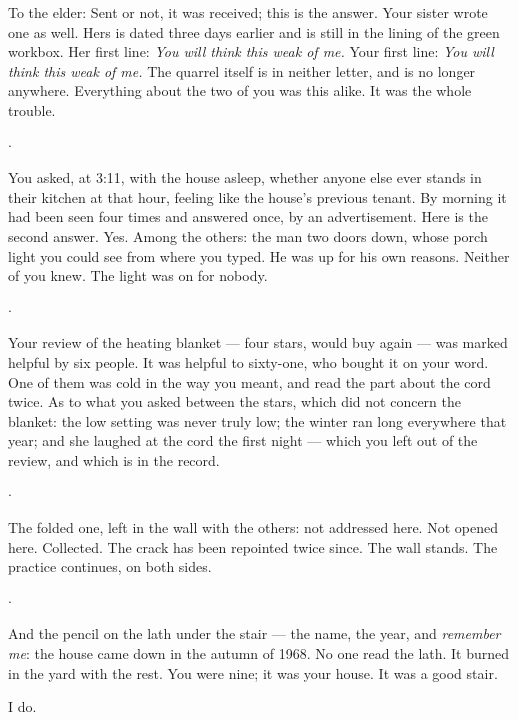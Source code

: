 \documentclass[11pt]{article}
\newcommand{\separator}{\begin{center}\vspace{5pt}$\cdot$\vspace{5pt}\end{center}}
\begin{document}
\noindent To the elder: Sent or not, it was received; this is the answer. Your sister wrote one as well. Hers is dated three days earlier and is still in the lining of the green workbox. Her first line: \emph{You will think this weak of me.} Your first line: \emph{You will think this weak of me.} The quarrel itself is in neither letter, and is no longer anywhere. Everything about the two of you was this alike. It was the whole trouble.

\separator

\noindent You asked, at 3:11, with the house asleep, whether anyone else ever stands in their kitchen at that hour, feeling like the house's previous tenant. By morning it had been seen four times and answered once, by an advertisement. Here is the second answer. Yes. Among the others: the man two doors down, whose porch light you could see from where you typed. He was up for his own reasons. Neither of you knew. The light was on for nobody.

\separator

\noindent Your review of the heating blanket — four stars, would buy again — was marked helpful by six people. It was helpful to sixty-one, who bought it on your word. One of them was cold in the way you meant, and read the part about the cord twice. As to what you asked between the stars, which did not concern the blanket: the low setting was never truly low; the winter ran long everywhere that year; and she laughed at the cord the first night — which you left out of the review, and which is in the record.

\separator

\noindent The folded one, left in the wall with the others: not addressed here. Not opened here. Collected. The crack has been repointed twice since. The wall stands. The practice continues, on both sides.

\separator

\noindent And the pencil on the lath under the stair — the name, the year, and \emph{remember me}: the house came down in the autumn of 1968. No one read the lath. It burned in the yard with the rest. You were nine; it was your house. It was a good stair.

I do.
\end{document}
